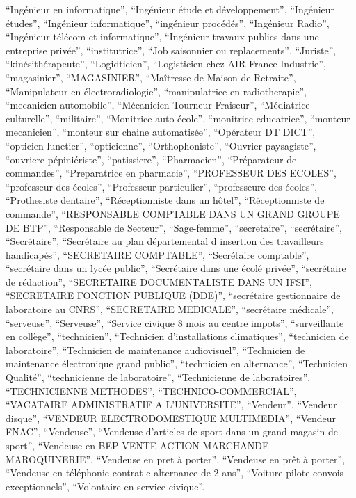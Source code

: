 \documentclass[
  letterpaper,
  DIV=11,
  numbers=noendperiod]{scrartcl}
\begin{document}
\begin{itemize}
  ``Ingénieur en informatique'', ``Ingénieur étude et développement'',
  ``Ingénieur études'', ``Ingénieur informatique'', ``ingénieur
  procédés'', ``Ingénieur Radio'', ``Ingénieur télécom et
  informatique'', ``Ingénieur travaux publics dans une entreprise
  privée'', ``institutrice'', ``Job saisonnier ou replacements'',
  ``Juriste'', ``kinésithérapeute'', ``Logidticien'', ``Logisticien chez
  AIR France Industrie'', ``magasinier'', ``MAGASINIER'', ``Maîtresse de
  Maison de Retraite'', ``Manipulateur en électroradiologie'',
  ``manipulatrice en radiotherapie'', ``mecanicien automobile'',
  ``Mécanicien Tourneur Fraiseur'', ``Médiatrice culturelle'',
  ``militaire'', ``Monitrice auto-école'', ``monitrice educatrice'',
  ``monteur mecanicien'', ``monteur sur chaine automatisée'',
  ``Opérateur DT DICT'', ``opticien lunetier'', ``opticienne'',
  ``Orthophoniste'', ``Ouvrier paysagiste'', ``ouvriere pépiniériste'',
  ``patissiere'', ``Pharmacien'', ``Préparateur de commandes'',
  ``Preparatrice en pharmacie'', ``PROFESSEUR DES ECOLES'', ``professeur
  des écoles'', ``Professeur particulier'', ``professeure des écoles'',
  ``Prothesiste dentaire'', ``Réceptionniste dans un hôtel'',
  ``Réceptionniste de commande'', ``RESPONSABLE COMPTABLE DANS UN GRAND
  GROUPE DE BTP'', ``Responsable de Secteur'', ``Sage-femme'',
  ``secretaire'', ``secrétaire'', ``Secrétaire'', ``Secrétaire au plan
  départemental d insertion des travailleurs handicapés'', ``SECRETAIRE
  COMPTABLE'', ``Secrétaire comptable'', ``secrétaire dans un lycée
  public'', ``Secrétaire dans une écolé privée'', ``secrétaire de
  rédaction'', ``SECRETAIRE DOCUMENTALISTE DANS UN IFSI'', ``SECRETAIRE
  FONCTION PUBLIQUE (DDE)'', ``secrétaire gestionnaire de laboratoire au
  CNRS'', ``SECRETAIRE MEDICALE'', ``secrétaire médicale'',
  ``serveuse'', ``Serveuse'', ``Service civique 8 mois au centre
  impots'', ``surveillante en collège'', ``technicien'', ``Technicien
  d'installations climatiques'', ``technicien de laboratoire'',
  ``Technicien de maintenance audiovisuel'', ``Technicien de maintenance
  électronique grand public'', ``technicien en alternance'',
  ``Technicien Qualité'', ``technicienne de laboratoire'',
  ``Technicienne de laboratoires'', ``TECHNICIENNE METHODES'',
  ``TECHNICO-COMMERCIAL'', ``VACATAIRE ADMINISTRATIF A L'UNIVERSITE'',
  ``Vendeur'', ``Vendeur disque'', ``VENDEUR ELECTRODOMESTIQUE
  MULTIMEDIA'', ``Vendeur FNAC'', ``Vendeuse'', ``Vendeuse d'articles de
  sport dans un grand magasin de sport'', ``Vendeuse en BEP VENTE ACTION
  MARCHANDE MAROQUINERIE'', ``Vendeuse en pret à porter'', ``Vendeuse en
  prêt à porter'', ``Vendeuse en téléphonie contrat e alternance de 2
  ans'', ``Voiture pilote convois exceptionnels'', ``Volontaire en
  service civique''.
\end{itemize}
\end{document}
